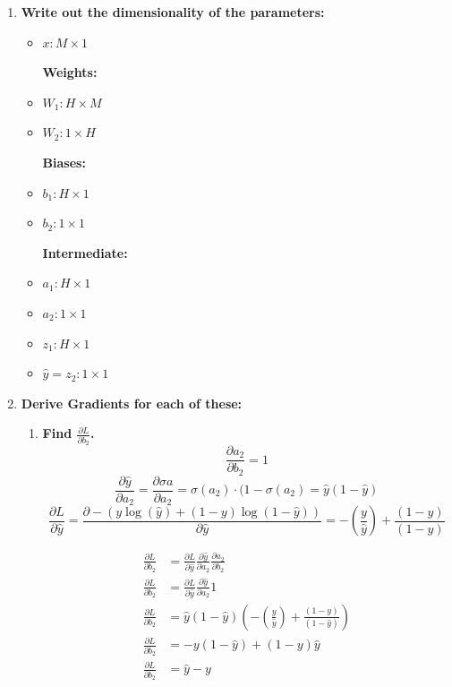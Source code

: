 \documentclass[submit]{harvardml}
\begin{document}
\begin{enumerate}
    \item \textbf{Write out the dimensionality of the parameters:}
    \begin{itemize}
    
        \textbf{Variables:}
        \item $x: M \times 1$
        
        \textbf{Weights:}
        \item $W_1 : H \times M$
        \item $W_2: 1 \times H$
        
        \textbf{Biases:}
        \item $b_1: H \times 1$
        \item $b_2: 1 \times 1$
        
        \textbf{Intermediate:}
        \item $a_1: H \times 1$
        \item $a_2: 1 \times 1$
        \item $z_1: H \times 1$
        \item $\hat{y}  =  z_2: 1 \times 1$
    \end{itemize}
    \item \textbf{Derive Gradients for each of these:}
    \begin{enumerate}
        \item \textbf{Find $\frac{\partial L}{\partial b_2}$. }
        $$
            \frac{\partial a_2}{\partial b_2} = 1
        $$
        $$
            \frac{\partial \hat{y}}{\partial a_2} = \frac{\partial \sigma a}{\partial a_2} = \sigma(a_2) \cdot (1-\sigma(a_2) = \hat{y}(1-\hat{y})
        $$
        $$
            \frac{\partial L}{\partial \hat{y}} = \frac{\partial -(y \log (\hat{y}) + (1 - y) \log (1 - \hat{y}))}{\partial \hat{y}} = - \left(\frac{y}{\hat{y}}\right) + \frac{(1-y)}{(1-\hat{y})}
        $$
        
        \begin{align*}
            \frac{\partial L}{\partial b_2} &= \frac{\partial L}{\partial \hat{y}} \frac{\partial \hat{y}}{\partial a_2} \frac{\partial a_2}{\partial b_2}\\
            \frac{\partial L}{\partial b_2} &= \frac{\partial L}{\partial \hat{y}} \frac{\partial \hat{y}}{\partial a_2} 1\\
            \frac{\partial L}{\partial b_2}&= \hat{y}(1-\hat{y}) \left( - \left(\frac{y}{\hat{y}}\right) + \frac{(1-y)}{(1-\hat{y})} \right)\\
            \frac{\partial L}{\partial b_2}&= -y(1-\hat{y}) + (1 - y) \hat{y}\\
            \frac{\partial L}{\partial b_2}&= \hat{y} - y
        \end{align*}
        

\end{enumerate}
\end{enumerate}
\end{document}

